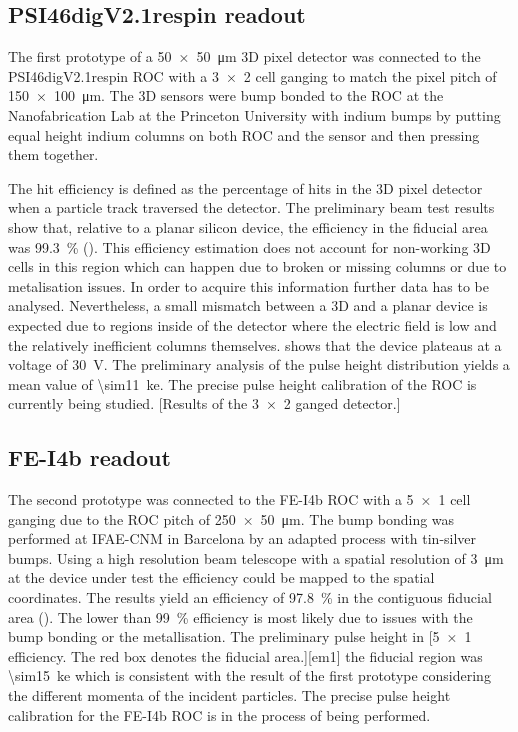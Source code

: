 \subsection{PSI46digV2.1respin readout}
The first prototype of a \SI{50x50}{\micro\meter} 3D pixel detector was connected to the PSI46digV2.1respin \ac{ROC} \cite{kornmayer} with a \SI{3x2}{} cell ganging to match the pixel pitch of \SI{150x100}{\micro\meter}. The 3D sensors were bump bonded to the \ac{ROC} at the Nanofabrication Lab at the Princeton University with indium bumps by putting equal height indium columns on both \ac{ROC} and the sensor and then pressing them together.\par
The hit efficiency is defined as the percentage of hits in the 3D pixel detector when a particle track traversed the detector. The preliminary beam test results show that, relative to a planar silicon device, the efficiency in the fiducial area was \SI{99.3}{\%} (). This efficiency estimation does not account for non-working 3D cells in this region which can happen due to broken or missing columns or due to metalisation issues. In order to acquire this information further data has to be analysed. Nevertheless, a small mismatch between a 3D and a planar device is expected due to regions inside of the detector where the electric field is low \cite{guilio} and the relatively inefficient columns themselves.  shows that the device plateaus at a voltage of \SI{30}{\volt}. The preliminary analysis of the pulse height distribution yields a mean value of \SI{\sim11}{\kilo e}. The precise pulse height calibration of the \ac{ROC} is currently being studied.
[Results of the \SI{3x2}{} ganged detector.]
\subsection{FE-I4b readout}
The second prototype was connected to the FE-I4b \ac{ROC} \cite{fei4} with a \SI{5x1}{} cell ganging due to the \ac{ROC} pitch of \SI{250x50}{\micro\meter}. The bump bonding was performed at IFAE-CNM in Barcelona by an adapted process with tin-silver bumps. Using a high resolution beam telescope with a spatial resolution of \SI{3}{\micro\meter} at the device under test the efficiency could be mapped to the spatial coordinates. The results yield an efficiency of \SI{97.8}{\%} in the contiguous fiducial area (). The lower than \SI{99}{\%} efficiency is most likely due to issues with the bump bonding or the metallisation. The preliminary pulse height in 
[\SI{5x1}{} efficiency. The red box denotes the fiducial area.][em1]
the fiducial region was \SI{\sim15}{\kilo e} which is consistent with the result of the first prototype considering the different momenta of the incident particles. The precise pulse height calibration for the FE-I4b \ac{ROC} is in the process of being performed.
